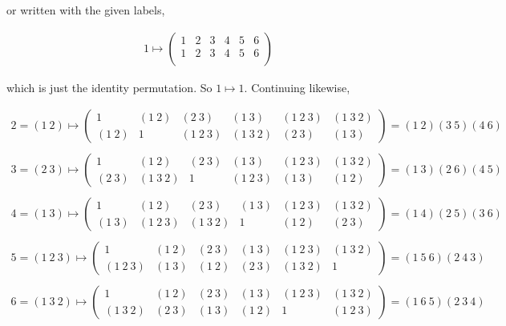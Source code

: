 \documentclass{exam}
\begin{document}
\begin{questions}
or written with the given labels,

\begin{align*}
  1\mapsto
  \begin{pmatrix}
  1 & 2 & 3 & 4 & 5 & 6 \\
  1 & 2 & 3 & 4 & 5 & 6 \\
  \end{pmatrix}
\end{align*}

which is just the identity permutation.  So $1\mapsto 1$.  Continuing likewise,

\begin{align*}
  2 = (1\ 2) \mapsto
  \begin{pmatrix}
  1 & (1\ 2) & (2\ 3) & (1\ 3) & (1\ 2\ 3) & (1\ 3\ 2) \\
  (1\ 2) & 1 & (1\ 2\ 3) & (1\ 3\ 2) & (2\ 3) & (1\ 3)
  \end{pmatrix} = (1\ 2)(3\ 5)(4\ 6) \\\\
    3 = (2\ 3) \mapsto
    \begin{pmatrix}
    1 & (1\ 2) & (2\ 3) & (1\ 3) & (1\ 2\ 3) & (1\ 3\ 2) \\
    (2\ 3) & (1\ 3\ 2) & 1 & (1\ 2\ 3) & (1\ 3) & (1\ 2)
    \end{pmatrix} = (1\ 3)(2\ 6)(4\ 5) \\\\
      4 = (1\ 3) \mapsto
      \begin{pmatrix}
      1 & (1\ 2) & (2\ 3) & (1\ 3) & (1\ 2\ 3) & (1\ 3\ 2) \\
      (1\ 3) & (1\ 2\ 3) & (1\ 3\ 2) & 1 & (1\ 2) & (2\ 3)
      \end{pmatrix} = (1\ 4)(2\ 5)(3\ 6) \\\\
        5 = (1\ 2\ 3) \mapsto
        \begin{pmatrix}
        1 & (1\ 2) & (2\ 3) & (1\ 3) & (1\ 2\ 3) & (1\ 3\ 2) \\
        (1\ 2\ 3) & (1\ 3) & (1\ 2) & (2\ 3) & (1\ 3\ 2) & 1
        \end{pmatrix} = (1\ 5\ 6)(2\ 4\ 3) \\\\
          6 = (1\ 3\ 2) \mapsto
          \begin{pmatrix}
          1 & (1\ 2) & (2\ 3) & (1\ 3) & (1\ 2\ 3) & (1\ 3\ 2) \\
          (1\ 3\ 2) & (2\ 3) & (1\ 3) & (1\ 2) & 1 & (1\ 2\ 3)
          \end{pmatrix} = (1\ 6\ 5)(2\ 3\ 4) \\\\
\end{align*}




\end{questions}
\end{document}
